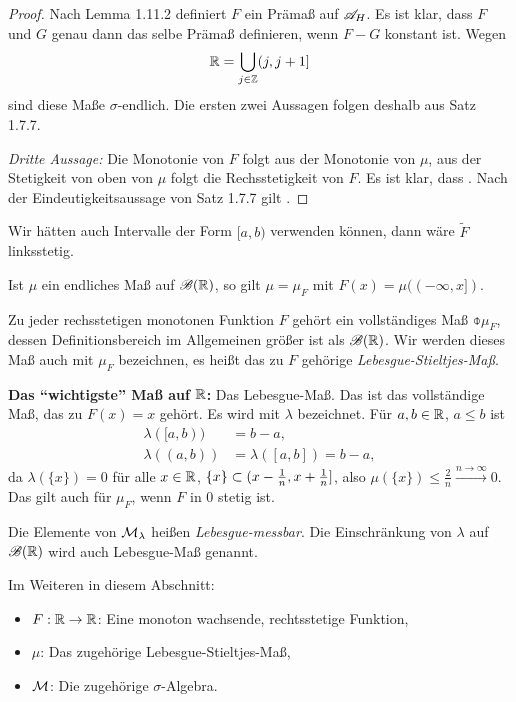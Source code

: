 \begin{proof}
 Nach Lemma 1.11.2 definiert $F$ ein Prämaß auf $\mathscr{A}_H$. Es ist klar, dass $F$ und $G$ genau dann das selbe Prämaß definieren, wenn $F-G$ konstant ist. Wegen 
 \[ \mathbb{R} = \bigcup_{j \in \mathbb{Z}} (j, j+1] \]
 sind diese Maße $\sigma$-endlich. Die ersten zwei Aussagen folgen deshalb aus Satz 1.7.7.
 
 \emph{Dritte Aussage:} Die Monotonie von $F$ folgt aus der Monotonie von $\mu$, aus der Stetigkeit von oben von $\mu$ folgt die Rechsstetigkeit von $F$. Es ist klar, dass . Nach der Eindeutigkeitsaussage von Satz 1.7.7 gilt .
\end{proof}

\begin{rmrk}
 Wir hätten auch Intervalle der Form $[a,b)$ verwenden können, dann wäre $\tilde{F}$ linksstetig. 
 
 Ist $\mu$ ein endliches Maß auf $\mathscr{B}(\mathbb{R})$, so gilt $\mu = \mu_F$ mit $F(x) = \mu((-\infty, x])$.
 
 Zu jeder rechsstetigen monotonen Funktion $F$ gehört ein vollständiges Maß $\obar{\mu}_F$, dessen Definitionsbereich im Allgemeinen größer ist als $\mathscr{B}(\mathbb{R})$. Wir werden dieses Maß auch mit $\mu_F$ bezeichnen, es heißt das zu $F$ gehörige \emph{Lebesgue-Stieltjes-Maß}.
\end{rmrk}

\textbf{Das ``wichtigste'' Maß auf $\mathbb{R}$:} Das Lebesgue-Maß. Das ist das vollständige Maß, das zu $F(x) = x$ gehört. Es wird mit $\lambda$ bezeichnet. Für $a,b \in \mathbb{R}$, $a \le b$ ist
\[ \begin{aligned}
    \lambda( [a,b) ) &= b - a, \\ 
    \lambda( (a,b) ) &= \lambda( [a,b] ) = b-a,
   \end{aligned} \]
da $\lambda(\{x\}) = 0$ für alle $x \in \mathbb{R}$, $\{ x \} \subset (x - \frac{1}{n}, x + \frac{1}{n}]$, also $\mu( \{ x \} ) \le \frac{2}{n} \xrightarrow{n \to \infty} 0$. Das gilt auch für $\mu_F$, wenn $F$ in 0 stetig ist.

Die Elemente von $\mathcal{M}_\lambda$ heißen \emph{Lebesgue-messbar}. Die Einschränkung von $\lambda$ auf $\mathscr{B}(\mathbb{R})$ wird auch Lebesgue-Maß genannt.

Im Weiteren in diesem Abschnitt:
\begin{itemize}
 \item $F: \mathbb{R} \to \mathbb{R}$: Eine monoton wachsende, rechtsstetige Funktion,
 \item $\mu$: Das zugehörige Lebesgue-Stieltjes-Maß,
 \item $\mathcal{M}$: Die zugehörige $\sigma$-Algebra.
\end{itemize}

